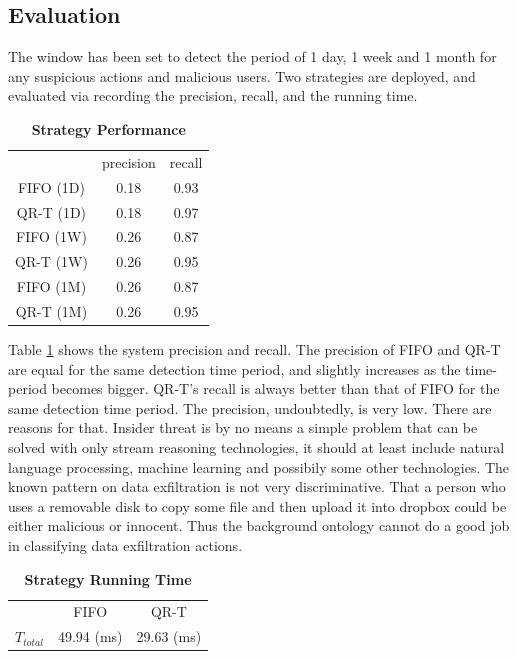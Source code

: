 \subsection{Evaluation}
The window has been set to detect the period of 1 day, 1 week and 1 month for any suspicious actions and malicious users. 
Two strategies are deployed, and evaluated via recording the precision, recall, and the running time. 

\begin{table}[!htbp]
	\centering
    \caption{\textbf{Strategy Performance}}
    \label{tab:sp}
    \begin{tabular}{|c||c|c|} \hline
    	& precision & recall \\ \hhline{|=#=|=|}
        FIFO (1D) & 0.18 & 0.93 \\ \hline
        QR-T (1D) & 0.18 & 0.97 \\ \hline
        FIFO (1W) & 0.26 & 0.87 \\ \hline
        QR-T (1W) & 0.26 & 0.95 \\ \hline
        FIFO (1M) & 0.26 & 0.87 \\ \hline
        QR-T (1M) & 0.26 & 0.95 \\ \hline
    \end{tabular}
\end{table}

Table \ref{tab:sp} shows the system precision and recall. 
The precision of FIFO and QR-T are equal for the same detection time period, and slightly increases as the time-period becomes bigger. 
QR-T's recall is always better than that of FIFO for the same detection time period. 
The precision, undoubtedly, is very low. 
There are reasons for that. 
Insider threat is by no means a simple problem that can be solved with only stream reasoning technologies, it should at least include natural language processing, machine learning and possibily some other technologies. 
The known pattern on data exfiltration is not very discriminative.
That a person who uses a removable disk to copy some file and then upload it into dropbox could be either malicious or innocent.
Thus the background ontology cannot do a good job in classifying data exfiltration actions.

\begin{table}[!htbp]
	\centering
    \caption{\textbf{Strategy Running Time}}
    \label{tab:srt}
    \begin{tabular}{|c||c|c|} \hline
	    & FIFO & QR-T \\ \hhline{|=#=|=|}
    	$T_{total}$ & 49.94 (ms) & 29.63 (ms) \\ \hline    
    \end{tabular}	
\end{table}

